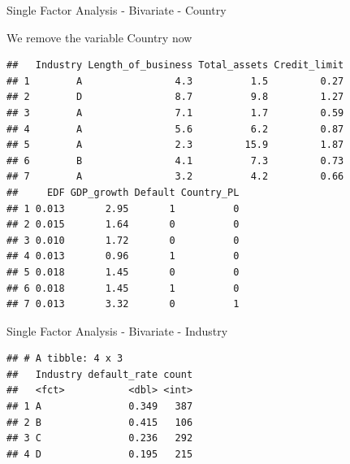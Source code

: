 \documentclass[9pt,ignorenonframetext,]{beamer}
\newenvironment{Shaded}{\begin{snugshade}}{\end{snugshade}}
\newcommand{\KeywordTok}[1]{\textcolor[rgb]{0.13,0.29,0.53}{\textbf{#1}}}
\newcommand{\DataTypeTok}[1]{\textcolor[rgb]{0.13,0.29,0.53}{#1}}
\newcommand{\DecValTok}[1]{\textcolor[rgb]{0.00,0.00,0.81}{#1}}
\newcommand{\StringTok}[1]{\textcolor[rgb]{0.31,0.60,0.02}{#1}}
\newcommand{\OtherTok}[1]{\textcolor[rgb]{0.56,0.35,0.01}{#1}}
\newcommand{\OperatorTok}[1]{\textcolor[rgb]{0.81,0.36,0.00}{\textbf{#1}}}
\newcommand{\NormalTok}[1]{#1}
\begin{document}
\begin{frame}[fragile]{Single Factor Analysis - Bivariate - Country}

We remove the variable Country now

\begin{verbatim}
##   Industry Length_of_business Total_assets Credit_limit
## 1        A                4.3          1.5         0.27
## 2        D                8.7          9.8         1.27
## 3        A                7.1          1.7         0.59
## 4        A                5.6          6.2         0.87
## 5        A                2.3         15.9         1.87
## 6        B                4.1          7.3         0.73
## 7        A                3.2          4.2         0.66
##     EDF GDP_growth Default Country_PL
## 1 0.013       2.95       1          0
## 2 0.015       1.64       0          0
## 3 0.010       1.72       0          0
## 4 0.013       0.96       1          0
## 5 0.018       1.45       0          0
## 6 0.018       1.45       1          0
## 7 0.013       3.32       0          1
\end{verbatim}

\end{frame}

\begin{frame}[fragile]{Single Factor Analysis - Bivariate - Industry}

\begin{Shaded}
\end{Shaded}

\begin{verbatim}
## # A tibble: 4 x 3
##   Industry default_rate count
##   <fct>           <dbl> <int>
## 1 A               0.349   387
## 2 B               0.415   106
## 3 C               0.236   292
## 4 D               0.195   215
\end{verbatim}

\end{frame}
\end{document}
